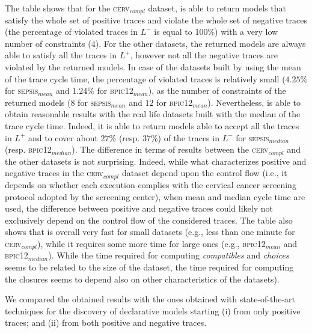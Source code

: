 The table shows that for the \textsc{cerv$_{compl}$} dataset, \nd is able to return models that satisfy the whole set of positive traces and violate the whole set of negative traces (the percentage of violated traces in $L^-$ is equal to 100\%) with a very low number of constraints (4). For the other datasets, the returned models are always able to satisfy all the traces in $L^+$, however not all the negative traces are violated by the returned models. In case of the datasets built by using the mean of the trace cycle time, the percentage of violated traces is relatively small ($4.25\%$ for \textsc{sepsis$_{mean}$} and $1.24\%$ for \textsc{bpic12$_{mean}$}), as the number of constraints of the returned models ($8$ for \textsc{sepsis$_{mean}$} and $12$ for \textsc{bpic12$_{mean}$}). Nevertheless, \nd is able to obtain reasonable results with the real life datasets built with the median of the trace cycle time. Indeed, it is able to return models able to accept all the traces in $L^+$ and to cover about $27\%$ (resp. $37\%$) of the traces in $L^-$ for \textsc{sepsis$_{median}$} (resp. \textsc{bpic12$_{median}$}). The difference in terms of results between the  \textsc{cerv$_{compl}$} and the other datasets is not surprising. Indeed, while what characterizes positive and negative traces in the \textsc{cerv$_{compl}$} dataset depend upon the control flow (i.e., it depends on whether each execution complies with the cervical cancer screening protocol adopted by the screening center), when mean and median cycle time are used, the difference between positive and negative traces could likely not exclusively depend on the control flow of the considered traces. 
The table also shows that \nd is overall very fast for small datasets (e.g., less than one minute for \textsc{cerv$_{compl}$}), while it requires some more time for large ones (e.g., \textsc{bpic12$_{mean}$} and \textsc{bpic12$_{median}$}). While the time required for computing \textit{compatibles} and \textit{choices} seems to be related to the size of the dataset, the time required for computing the closures seems to depend also on other characteristics of the datasets). 

We compared the obtained results with the ones obtained with state-of-the-art techniques for the discovery of declarative models starting (i) from  only positive traces; and (ii) from both positive and negative traces. 


